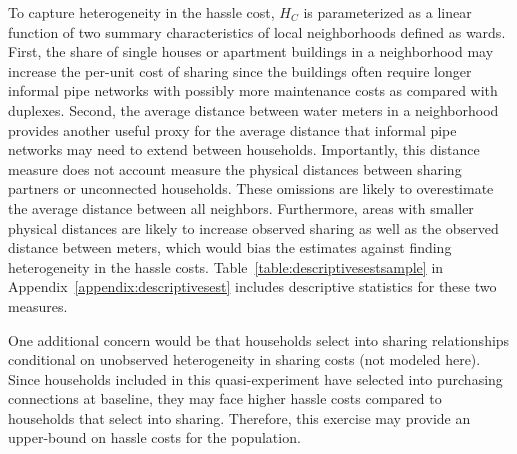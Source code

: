\documentclass[12pt]{article}
\begin{document}
To capture heterogeneity in the hassle cost, $H_C$ is parameterized as a linear function of two summary characteristics of local neighborhoods defined as wards.  First, the share of single houses or apartment buildings in a neighborhood may increase the per-unit cost of sharing since the buildings often require longer informal pipe networks with possibly more maintenance costs as compared with duplexes.  Second, the average distance between water meters in a neighborhood provides another useful proxy for the average distance that informal pipe networks may need to extend between households.  Importantly, this distance measure does not account measure the physical distances between sharing partners or unconnected households.  These omissions are likely to overestimate the average distance between all neighbors.  Furthermore, areas with smaller physical distances are likely to increase observed sharing as well as the observed distance between meters, which would bias the estimates against finding heterogeneity in the hassle costs.  Table~\ref{table:descriptivesestsample} in Appendix~\ref{appendix:descriptivesest} includes descriptive statistics for these two measures.

One additional concern would be that households select into sharing relationships conditional on unobserved heterogeneity in sharing costs (not modeled here).  Since households included in this quasi-experiment have selected into purchasing connections at baseline, they may face higher hassle costs compared to households that select into sharing.  Therefore, this exercise may provide an upper-bound on hassle costs for the population. 


\end{document}
